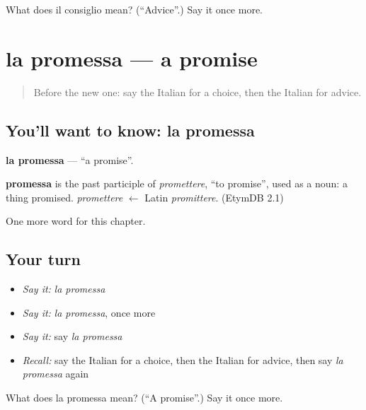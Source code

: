 \begin{tcolorbox}[breakable,colback=teal!4,colframe=teal!35!black,title={Before you move on}]
What does il consiglio mean? (\textquotedblleft{}Advice\textquotedblright{}.) Say it once more.
\end{tcolorbox}
\section[la promessa]{la promessa — a promise}

\label{lesson:IT-C197-promessa}



\begin{quote}
Before the new one: say the Italian for a choice, then the Italian for advice.
\end{quote}

\subsection*{You'll want to know: la promessa}
\textbf{la promessa} — \textquotedblleft{}a promise\textquotedblright{}.

\begin{cousinweb}
\textbf{promessa} is the past participle of \emph{promettere}, \textquotedblleft{}to promise\textquotedblright{}, used as a noun: a thing promised. \emph{promettere} $\leftarrow$ Latin \emph{promittere}. (EtymDB 2.1)
\end{cousinweb}

\begin{grammarlens}[title={What you've built}]
One more word for this chapter.
\end{grammarlens}

\subsection*{Your turn}
\begin{itemize}
\raggedright
  \item \emph{Say it:} \emph{la promessa}
  \item \emph{Say it:} \emph{la promessa}, once more
  \item \emph{Say it:} say \emph{la promessa}
  \item \emph{Recall:} say the Italian for a choice, then the Italian for advice, then say \emph{la promessa} again
\end{itemize}

\begin{tcolorbox}[breakable,colback=teal!4,colframe=teal!35!black,title={Before you move on}]
What does la promessa mean? (\textquotedblleft{}A promise\textquotedblright{}.) Say it once more.
\end{tcolorbox}
